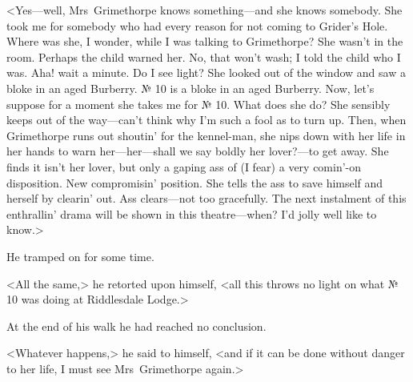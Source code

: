 <Yes—well, Mrs~Grimethorpe knows something—and she knows somebody.  She took me for somebody who had every reason for not coming to Grider's Hole. Where was she, I wonder, while I was talking to Grimethorpe? She wasn't in the room. Perhaps the child warned her. No, that won't wash; I told the child who I was. Aha! wait a minute. Do I see light? She looked out of the window and saw a bloke in an aged Burberry. № 10 is a bloke in an aged Burberry. Now, let's suppose for a moment she takes me for № 10. What does she do? She sensibly keeps out of the way—can't think why I'm such a fool as to turn up.  Then, when Grimethorpe runs out shoutin' for the kennel-man, she nips down with her life in her hands to warn her—her—shall we say boldly her lover?—to get away. She finds it isn't her lover, but only a gaping ass of (I fear) a very comin'-on disposition. New compromisin' position. She tells the ass to save himself and herself by clearin' out. Ass clears—not too gracefully. The next instalment of this enthrallin' drama will be shown in this theatre—when? I'd jolly well like to know.>

He tramped on for some time.

<All the same,> he retorted upon himself, <all this throws no light on what № 10 was doing at Riddlesdale Lodge.>

At the end of his walk he had reached no conclusion.

<Whatever happens,> he said to himself, <and if it can be done without danger to her life, I must see Mrs~Grimethorpe again.>



